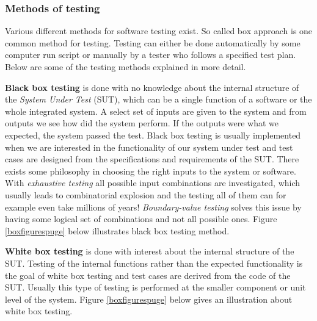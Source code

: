 \documentclass[english,12pt,a4paper,pdftex,elec,utf8]{aaltothesis}
\begin{document}
\subsubsection{Methods of testing}
Various different methods for software testing exist. So called box approach is one common method for testing. Testing can either be done automatically by some computer run script or manually by a tester who follows a specified test plan. \cite{sularikurssi} Below are some of the testing methods explained in more detail.\par 
\textbf{Black box testing} is done with no knowledge about the internal structure of the \textit{System Under Test} (SUT), which can be a single function of a software or the whole integrated system. A select set of inputs are given to the system and from outputs we see how did the system perform. If the outputs were what we expected, the system passed the test. Black box testing is usually implemented when we are interested in the functionality of our system under test and test cases are designed from the specifications and requirements of the SUT. There exists some philosophy in choosing the right inputs to the system or software. With \textit{exhaustive testing} all possible input combinations are investigated, which usually leads to combinatorial explosion and the testing all of them can for example even take millions of years! \textit{Boundary-value testing} solves this issue by having some logical set of combinations and not all possible ones. Figure \ref{boxfigurespuge} below illustrates black box testing method. \cite{sularikurssi}\par 
\textbf{White box testing} is done with interest about the internal structure of the SUT. Testing of the internal functions rather than the expected functionality is the goal of white box testing and test cases are derived from the code of the SUT. Usually this type of testing is performed at the smaller component or unit level of the system. Figure \ref{boxfigurespuge} below gives an illustration about white box testing. \cite{sularikurssi}\par
\end{document}
